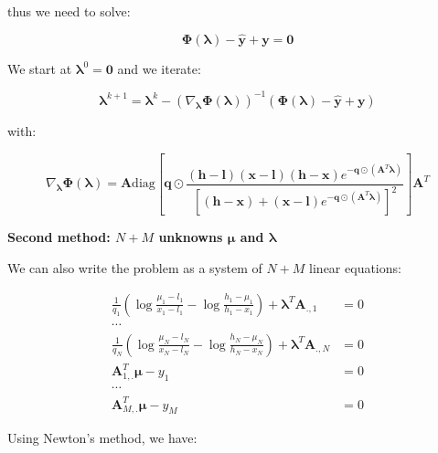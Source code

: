\documentclass{tex/note}
\begin{document}
thus we need to solve:

\begin{equation*}
\bm{\Phi} \left( \bm{\lambda} \right) - \hat{\bm{y}} + \bm{y} = \bm{0}
\end{equation*}

We start at $\bm{\lambda}^0 = \bm{0}$ and we iterate:

\begin{equation*}
\bm{\lambda}^{k + 1} = \bm{\lambda}^k - \left( \nabla_{\bm{\lambda}} \bm{\Phi} \left( \bm{\lambda} \right) \right) ^{-1} \left( \bm{\Phi} \left( \bm{\lambda} \right) - \hat{\bm{y}} + \bm{y} \right)
\end{equation*}

with:

\begin{equation*}
\nabla_{\bm{\lambda}} \bm{\Phi} \left( \bm{\lambda} \right) = \bm{A} \text{diag} \left[ \bm{q} \odot \frac{\left( \bm{h} - \bm{l} \right) \left( \bm{x} - \bm{l} \right) \left( \bm{h} - \bm{x} \right) e^{- \bm{q} \odot \left( \bm{A}^T \bm{\lambda} \right)}}{\left[ \left( \bm{h} - \bm{x} \right) + \left( \bm{x} - \bm{l} \right) e^{- \bm{q} \odot \left( \bm{A}^T \bm{\lambda} \right)} \right]^2} \right] \bm{A}^T
\end{equation*}

\textbf{Second method: $N + M$ unknowns $\bm{\mu}$ and $\bm{\lambda}$}

We can also write the problem as a system of $N + M$ linear equations:

\begin{align*}
\frac{1}{q_1} \left( \log \frac{\mu_1 - l_1}{x_1 - l_1} - \log \frac{h_1 - \mu_1}{h_1 - x_1} \right) + \bm{\lambda}^T \bm{A}_{.,1} &= 0 \\
\cdots & \\
\frac{1}{q_N} \left( \log \frac{\mu_N - l_N}{x_N - l_N} - \log \frac{h_N - \mu_N}{h_N - x_N} \right) + \bm{\lambda}^T \bm{A}_{.,N} &= 0 \\
\bm{A}_{1,.}^T \bm{\mu} - y_1 &= 0 \\
\cdots & \\
\bm{A}_{M,.}^T \bm{\mu} - y_M &= 0
\end{align*}

Using Newton's method, we have:
\end{document}
